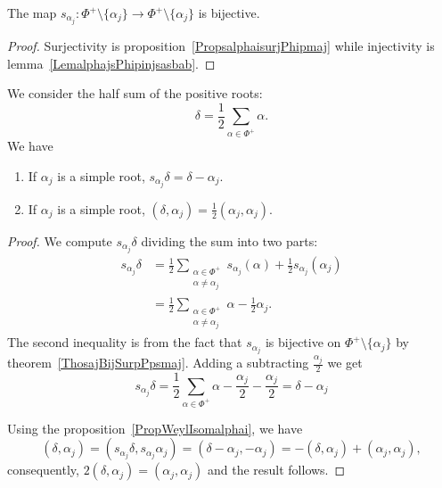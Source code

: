 \begin{theorem}      \label{ThosajBijSurpPpsmaj}
    The map \( s_{\alpha_j}\colon \Phi^+\setminus\{ \alpha_j \}\to \Phi^+\setminus\{ \alpha_j \}\) is bijective.
\end{theorem}

\begin{proof}
    Surjectivity is proposition~\ref{PropsalphaisurjPhipmaj} while injectivity is lemma~\ref{LemalphajsPhipinjsasbab}.
\end{proof}

\begin{lemma}
    We consider the half sum of the positive roots:
    \begin{equation}
        \delta=\frac{ 1 }{2}\sum_{\alpha\in\Phi^+}\alpha.
    \end{equation}
    We have
    \begin{enumerate}
        \item
            If \( \alpha_j\) is a simple root, \( s_{\alpha_j}\delta=\delta-\alpha_j\).
        \item
            If \( \alpha_j\) is a simple root, \( (\delta,\alpha_j)=\frac{ 1 }{2}(\alpha_j,\alpha_j)\).
    \end{enumerate}
\end{lemma}

\begin{proof}
    We compute \( s_{\alpha_j}\delta\) dividing the sum into two parts:
    \begin{subequations}
        \begin{align}
            s_{\alpha_j}\delta&=\frac{ 1 }{2}\sum_{\substack{\alpha\in\Phi^+\\\alpha\neq\alpha_j}}s_{\alpha_j}(\alpha)+\frac{ 1 }{2}s_{\alpha_j}(\alpha_j)\\
            &=\frac{ 1 }{2}\sum_{\substack{\alpha\in\Phi^+\\\alpha\neq\alpha_j}}\alpha-\frac{ 1 }{2}\alpha_j.
        \end{align}
    \end{subequations}
    The second inequality is from the fact that \( s_{\alpha_j}\) is bijective on \( \Phi^+\setminus\{ \alpha_j \}\) by theorem~\ref{ThosajBijSurpPpsmaj}. Adding a subtracting \( \frac{ \alpha_j }{2}\) we get
    \begin{equation}
        s_{\alpha_j}\delta=\frac{ 1 }{2}\sum_{\alpha\in\Phi^+}\alpha-\frac{ \alpha_j }{2}-\frac{ \alpha_j }{2}=\delta-\alpha_j
    \end{equation}

    Using the proposition~\ref{PropWeylIsomalphai}, we have
    \begin{equation}
        (\delta,\alpha_j)=(s_{\alpha_j}\delta,s_{\alpha_j}\alpha_j)=(\delta-\alpha_j,-\alpha_j)=-(\delta,\alpha_j)+(\alpha_j,\alpha_j),
    \end{equation}
    consequently, \( 2(\delta,\alpha_j)=(\alpha_j,\alpha_j)\) and the result follows.
\end{proof}

